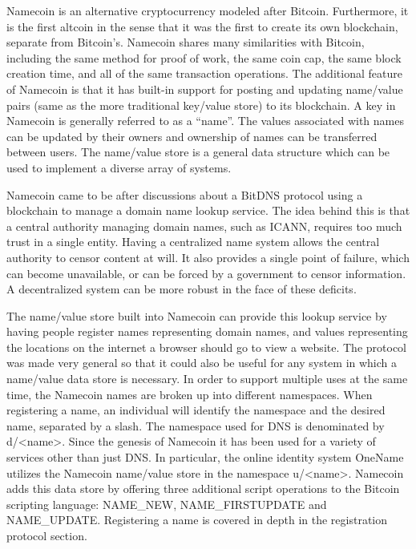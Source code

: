 Namecoin is an alternative cryptocurrency modeled after Bitcoin\cite{nakamoto2008bitcoin}. Furthermore, it is the first altcoin in the sense that it was the first to create its own blockchain, separate from Bitcoin's. Namecoin shares many similarities with Bitcoin, including the same method for proof of work, the same coin cap, the same block creation time, and all of the same transaction operations. The additional feature of Namecoin is that it has built-in support for posting and updating name/value pairs (same as the more traditional key/value store) to its blockchain. A key in Namecoin is generally referred to as a ``name''. The values associated with names can be updated by their owners and ownership of names can be transferred between users. The name/value store is a general data structure which can be used to implement a diverse array of systems.

Namecoin came to be after discussions about a BitDNS\cite{bitdns} protocol using a blockchain to manage a domain name lookup service. The idea behind this is that a central authority managing domain names, such as ICANN, requires too much trust in a single entity. Having a centralized name system allows the central authority to censor content at will. It also provides a single point of failure, which can become unavailable, or can be forced by a government to censor information. A decentralized system can be more robust in the face of these deficits.

The name/value store built into Namecoin can provide this lookup service by having people register names representing domain names, and values representing the locations on the internet a browser should go to view a website. The protocol was made very general so that it could also be useful for any system in which a name/value data store is necessary. In order to support multiple uses at the same time, the Namecoin names are broken up into different namespaces. When registering a name, an individual will identify the namespace and the desired name, separated by a slash. The namespace used for DNS is denominated by d/<name>. Since the genesis of Namecoin it has been used for a variety of services other than just DNS. In particular, the online identity system OneName utilizes the Namecoin name/value store in the namespace u/<name>. Namecoin adds this data store by offering three additional script operations to the Bitcoin scripting language: NAME\_NEW, NAME\_FIRSTUPDATE and NAME\_UPDATE. Registering a name is covered in depth in the registration protocol section. 

